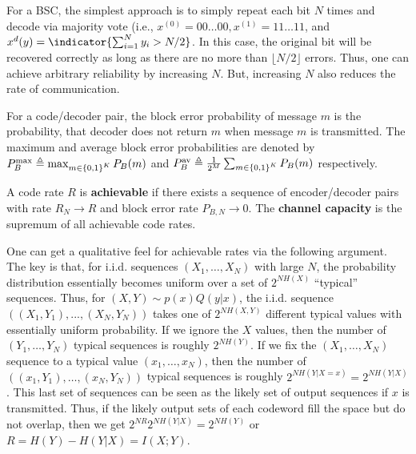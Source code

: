 \documentclass[letterpaper,10pt,english]{article}
\begin{document}
\begin{shaded*}\begin{exmp}
For a BSC, the simplest approach is to simply repeat each bit $N$ times and decode via majority vote (i.e., $x^{(0)} = 00 \dots 00, x^{(1)} = 11 \dots 11$, and $x^{d}(y) =\indicator{\sum_{i=1}^Ny_i > N/2}$. 
In this case, the original bit will be recovered correctly as long as there are no more than $\lfloor N/2\rfloor$ errors. 
Thus, one can achieve arbitrary reliability by increasing $N$. 
But, increasing $N$ also reduces the rate of communication.
\end{exmp}\end{shaded*} 
\begin{defn}
For a code/decoder pair, the block error probability of message $m$ is the probability, 
that decoder does not return $m$ when message $m$ is transmitted. 
The maximum and average block error probabilities are denoted by $P_B^{\max} \triangleq \max_{m \in \left\{0,1\right\}^K} P_B(m)$ and $P_B^{\text{av}} \triangleq \frac{1}{2^M}\sum_{m \in \left\{0,1\right\}^K}P_B(m)$ respectively. 
\end{defn} 
\begin{defn}
A code rate $R$ is \textbf{achievable} if there exists a sequence of encoder/decoder pairs with rate $R_N \to R$ and block error rate $P_{B,N} \to 0$. 
The \textbf{channel capacity} is the supremum of all achievable code rates.
\end{defn}
\begin{rem} 
One can get a qualitative feel for achievable rates via the following argument. 
The key is that, for i.i.d. sequences $(X_1,  \dots , X_N)$ with large $N$, 
the probability distribution essentially becomes uniform over a set of $2^{NH(X)}$ ``typical'' sequences. 
Thus, for $(X,Y) \sim p(x)Q(y|x)$, the i.i.d. sequence $((X_1, Y_1), . . . , (X_N , Y_N))$ takes one of 
$2^{NH(X,Y)}$ different typical values with essentially uniform probability. 
If we ignore the $X$ values, then the number of $(Y_1, \dots, Y_N)$ typical sequences is roughly $2^{NH(Y)}$. 
If we fix the $(X_1, \dots, X_N)$ sequence to a typical value $(x_1, \dots, x_N)$, 
then the number of $((x_1,Y_1), \dots, (x_N,Y_N))$ typical sequences is roughly $2^{NH(Y|X=x)} = 2^{NH(Y|X)}$. 
This last set of sequences can be seen as the likely set of output sequences if $x$ is transmitted. 
Thus, if the likely output sets of each codeword fill the space but do not overlap, then we get $2^{NR}2^{NH(Y|X)} = 2^{NH(Y)}$ or $R=H(Y) -H(Y|X)=I(X;Y)$. 
\end{rem}
\end{document}
